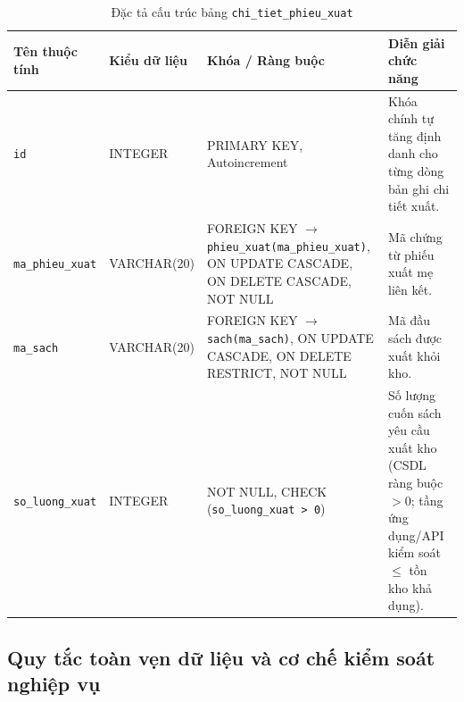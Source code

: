 \documentclass[12pt,a4paper]{article}
\begin{document}
\begin{table}[H]
\centering
\small
\renewcommand{\arraystretch}{1.2}
\begin{tabularx}{\textwidth}{|>{\raggedright\arraybackslash}p{3.0cm}|>{\raggedright\arraybackslash}p{2.6cm}|>{\raggedright\arraybackslash}p{3.8cm}|>{\raggedright\arraybackslash}X|}
\hline
\textbf{Tên thuộc tính} & \textbf{Kiểu dữ liệu} & \textbf{Khóa / Ràng buộc} & \textbf{Diễn giải chức năng} \\
\hline
\texttt{id} & INTEGER & PRIMARY KEY, Autoincrement & Khóa chính tự tăng định danh cho từng dòng bản ghi chi tiết xuất. \\
\hline
\texttt{ma\_phieu\_xuat} & VARCHAR(20) & FOREIGN KEY $\rightarrow$ \texttt{phieu\_xuat(ma\_phieu\_xuat)}, ON UPDATE CASCADE, ON DELETE CASCADE, NOT NULL & Mã chứng từ phiếu xuất mẹ liên kết. \\
\hline
\texttt{ma\_sach} & VARCHAR(20) & FOREIGN KEY $\rightarrow$ \texttt{sach(ma\_sach)}, ON UPDATE CASCADE, ON DELETE RESTRICT, NOT NULL & Mã đầu sách được xuất khỏi kho. \\
\hline
\texttt{so\_luong\_xuat} & INTEGER & NOT NULL, CHECK (\texttt{so\_luong\_xuat > 0}) & Số lượng cuốn sách yêu cầu xuất kho (CSDL ràng buộc $> 0$; tầng ứng dụng/API kiểm soát $\le$ tồn kho khả dụng). \\
\hline
\end{tabularx}
\caption{Đặc tả cấu trúc bảng \texttt{chi\_tiet\_phieu\_xuat}}
\label{tab:csdl-ctpx}
\end{table}

\subsection{Quy tắc toàn vẹn dữ liệu và cơ chế kiểm soát nghiệp vụ}
\label{subsec:toan-veng-du-lieu}
\end{document}
